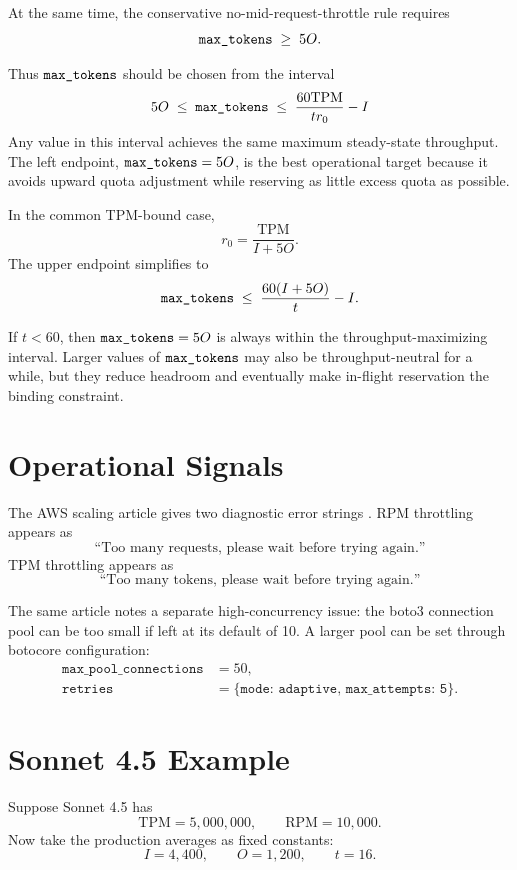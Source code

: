 \documentclass[12pt]{extarticle}
\newcommand{\maxtok}{\text{\texttt{max\_tokens}}}
\newcommand{\inputtokens}{I}
\newcommand{\outputtokens}{O}
\newcommand{\TPM}{\text{TPM}}
\newcommand{\RPM}{\text{RPM}}
\begin{document}
At the same time, the conservative no-mid-request-throttle rule requires
\[
\maxtok \;\geq\; 5\outputtokens.
\]

Thus $\maxtok$ should be chosen from the interval
\[
5\outputtokens
\;\leq\;
\maxtok
\;\leq\;
\frac{60\TPM}{t r_0} - \inputtokens
\]
Any value in this interval achieves the same maximum steady-state throughput. The left endpoint, $\maxtok = 5\outputtokens$, is the best operational target because it avoids upward quota adjustment while reserving as little excess quota as possible.

In the common TPM-bound case,
\[
r_0 = \frac{\TPM}{\inputtokens + 5\outputtokens}.
\]
The upper endpoint simplifies to
\[
\maxtok \;\leq\; \frac{60(\inputtokens + 5\outputtokens)}{t} - \inputtokens.
\]

If $t < 60$, then $\maxtok = 5\outputtokens$ is always within the throughput-maximizing interval. Larger values of $\maxtok$ may also be throughput-neutral for a while, but they reduce headroom and eventually make in-flight reservation the binding constraint.

\section{Operational Signals}

The AWS scaling article gives two diagnostic error strings \cite{bedrock-scale}. RPM throttling appears as
\[
\text{``Too many requests, please wait before trying again.''}
\]
TPM throttling appears as
\[
\text{``Too many tokens, please wait before trying again.''}
\]

The same article notes a separate high-concurrency issue: the boto3 connection pool can be too small if left at its default of 10. A larger pool can be set through botocore configuration:
\[
\begin{aligned}
\texttt{max\_pool\_connections} &= 50,\\
\texttt{retries} &= \{\texttt{mode: adaptive, max\_attempts: 5}\}.
\end{aligned}
\]

\section{Sonnet 4.5 Example}

Suppose Sonnet 4.5 has
\[
\TPM = 5{,}000{,}000, \qquad \RPM = 10{,}000.
\]
Now take the production averages as fixed constants:
\[
\inputtokens = 4{,}400, \qquad
\outputtokens = 1{,}200, \qquad
t = 16.
\]
\end{document}
